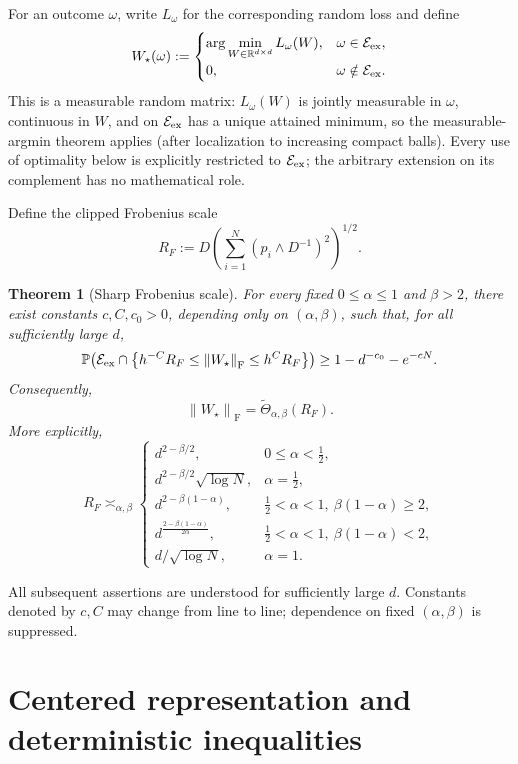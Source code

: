 \documentclass[11pt]{article}
\newtheorem{theorem}{Theorem}[section]
\theoremstyle{remark}
\newcommand{\R}{\mathbb R}
\newcommand{\Pp}{\mathbb P}
\newcommand{\norm}[1]{\left\lVert #1\right\rVert}
\newcommand{\F}{\mathrm{F}}
\newcommand{\1}{\mathbf 1}
\begin{document}
For an outcome $\omega$, write $L_\omega$ for the corresponding
random loss and define
\[
 W_\star(\omega)
 :=
 \begin{cases}
 \displaystyle\arg\min_{W\in\R^{d\times d}}L_\omega(W),
 &\omega\in\mathcal E_{\rm ex},\\[2mm]
 0,&\omega\notin\mathcal E_{\rm ex}.
 \end{cases}
\]
This is a measurable random matrix: $L_\omega(W)$ is jointly measurable
in $\omega$, continuous in $W$, and on $\mathcal E_{\rm ex}$ has a
unique attained minimum, so the measurable-argmin theorem applies
(after localization to increasing compact balls).  Every use of
optimality below is explicitly restricted to $\mathcal E_{\rm ex}$;
the arbitrary extension on its complement has no mathematical role.

Define the clipped Frobenius scale
\begin{equation}
 R_F
 :=D\left(\sum_{i=1}^N (p_i\wedge D^{-1})^2\right)^{1/2}.
 \label{eq:RF-def}
\end{equation}

\begin{theorem}[Sharp Frobenius scale]
\label{thm:main}
For every fixed $0\leq\alpha\leq1$ and $\beta>2$, there exist constants
$c,C,c_0>0$, depending only on $(\alpha,\beta)$, such that, for all
sufficiently large $d$,
\[
 \Pp\!\left(
 \mathcal E_{\rm ex}\cap
 \left\{h^{-C}R_F\leq\norm{W_\star}_{\F}\leq h^C R_F\right\}
 \right)
 \geq 1-d^{-c_0}-e^{-cN}.
\]
Consequently,
\[
 \norm{W_\star}_{\F}=\widetilde\Theta_{\alpha,\beta}(R_F).
\]
More explicitly,
\[
 R_F\asymp_{\alpha,\beta}
 \begin{cases}
 d^{2-\beta/2},
   &0\leq\alpha<\frac12,\\[2mm]
 d^{2-\beta/2}\sqrt{\log N},
   &\alpha=\frac12,\\[2mm]
 d^{2-\beta(1-\alpha)},
   &\frac12<\alpha<1,\ \beta(1-\alpha)\geq2,\\[2mm]
 d^{\frac{2-\beta(1-\alpha)}{2\alpha}},
   &\frac12<\alpha<1,\ \beta(1-\alpha)<2,\\[2mm]
 d/\sqrt{\log N},
   &\alpha=1.
 \end{cases}
\]
\end{theorem}

All subsequent assertions are understood for sufficiently large $d$.
Constants denoted by $c,C$ may change from line to line; dependence on
fixed $(\alpha,\beta)$ is suppressed.

\section{Centered representation and deterministic inequalities}
\end{document}
